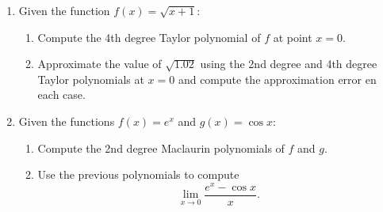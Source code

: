\begin{enumerate}[leftmargin=*]
\item Given the function $f(x)=\sqrt{x+1}$:
\begin{enumerate}
\item Compute the 4th degree Taylor polynomial of $f$ at point $x=0$.
\item Approximate the value of $\sqrt{1.02}$ using the 2nd degree and 4th degree Taylor polynomials at $x=0$ and compute the approximation error en each case.
\end{enumerate}

\item Given the functions $f(x)=e^x$ and $g(x)=\cos x$:
\begin{enumerate}
\item Compute the 2nd degree Maclaurin polynomials of $f$ and $g$.
\item Use the previous polynomials to compute 
\[ \lim_{x\rightarrow 0}\frac{e^x-\cos x}{x}.\]
\end{enumerate}

\end{enumerate}
